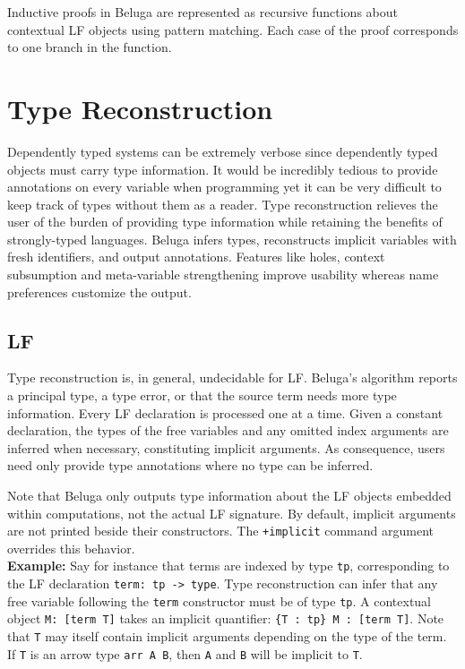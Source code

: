 \documentclass[11pt]{article}
\begin{document}
Inductive proofs in Beluga are represented as recursive functions about contextual LF objects using pattern matching. Each case of the proof corresponds to one branch in the function.
   


\section{Type Reconstruction}
Dependently typed systems can be extremely verbose since dependently typed objects must carry type information. It would be incredibly tedious to provide annotations on every variable when programming yet it can be very difficult to keep track of types without them as a reader. Type reconstruction relieves the user of the burden of providing type information while retaining the benefits of strongly-typed languages. Beluga infers types, reconstructs implicit variables with fresh identifiers, and output annotations. Features like holes, context subsumption and meta-variable strengthening improve usability whereas name preferences customize the output. 

\subsection{LF}
Type reconstruction is, in general, undecidable for LF. Beluga's algorithm reports a principal type, a type error, or that the source term needs more type information. Every LF declaration is processed one at a time. Given a constant declaration, the types of the free variables and any omitted index arguments are inferred when necessary, constituting implicit arguments. As consequence, users need only provide type annotations where no type can be inferred. 

Note that Beluga only outputs type information about the LF objects embedded within computations, not the actual LF signature. By default, implicit arguments are not printed beside their constructors. The \texttt{+implicit} command argument overrides this behavior. \\

\textbf{Example:} Say for instance that terms are indexed by type \texttt{tp}, corresponding to the LF declaration \texttt{term: tp -> type}. Type reconstruction can infer that any free variable following the \texttt{term} constructor must be of type \texttt{tp}. A contextual object \texttt{M: [term T]} takes an implicit quantifier: \texttt{\{T : tp\} M : [term T]}. Note that \texttt{T} may itself contain implicit arguments depending on the type of the term. If \texttt{T} is an arrow type \texttt{arr A B}, then \texttt{A} and \texttt{B} will be implicit to \texttt{T}.
\end{document}
